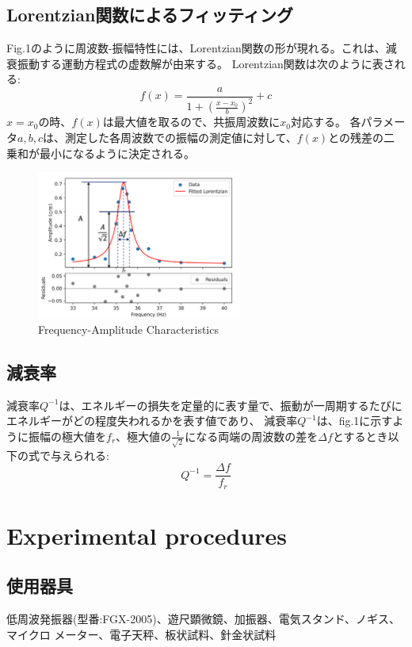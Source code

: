 \documentclass[a4paper,11pt]{jsarticle}
\begin{document}
\subsection{Lorentzian関数によるフィッティング}
Fig.1のように周波数-振幅特性には、Lorentzian関数の形が現れる。これは、減衰振動する運動方程式の虚数解が由来する。
Lorentzian関数は次のように表される:
\begin{equation}
  f(x) = \frac{a}{1 + (\frac{x - x_0}{b})^2} + c
\end{equation}
$x = x_0$の時、$f(x)$は最大値を取るので、共振周波数に$x_0$対応する。
各パラメータ$a, b, c$は、測定した各周波数での振幅の測定値に対して、$f(x)$との残差の二乗和が最小になるように決定される。
\begin{figure}[H]
  \center
  \includegraphics[width=0.6\textwidth]{figs/attenuation_1.pdf}
  \caption{Frequency-Amplitude Characteristics}
\end{figure}
\subsection{減衰率}
減衰率$Q^{-1}$は、エネルギーの損失を定量的に表す量で、振動が一周期するたびにエネルギーがどの程度失われるかを表す値であり、
減衰率$Q^{-1}$は、fig.1に示すように振幅の極大値を$f_r$、極大値の$\frac{1}{\sqrt{2}}$になる両端の周波数の差を$\Delta f$とするとき以下の式で与えられる:
\begin{equation}
  Q^{-1} = \frac{\Delta f}{f_r}
\end{equation}
\section{Experimental procedures}
\subsection*{使用器具}
低周波発振器(型番:FGX-2005)、遊尺顕微鏡、加振器、電気スタンド、ノギス、マイクロ
メーター、電子天秤、板状試料、針金状試料
\end{document}
